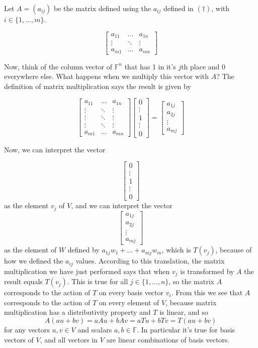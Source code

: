\documentclass{article}
\theoremstyle{plain}
\newcommand{\bF}{\mathbb{F}}
\begin{document}
Let $A=(a_{ij})$ be the matrix defined using the $a_{ij}$ defined in $(\dagger)$, with $i\in\{1,\ldots,m\}$. 

\[
\begin{bmatrix}
a_{11}  & \dots & a_{1n} \\
\vdots & \ddots & \vdots \\
a_{m1}  & \dots & a_{mn} 
\end{bmatrix}
\]

Now, think of the column vector of $\bF^n$ that has 1 in it's $j$th place and 0 everywhere else. What happens when we multiply this vector with $A$? The definition of matrix multiplication says the result is given by

\[
\begin{bmatrix}
a_{11}  & \dots & a_{1n} \\
\vdots & \ddots & \vdots \\
\vdots & \ddots & \vdots \\
\vdots & \ddots & \vdots \\
a_{m1}  & \dots & a_{mn} 
\end{bmatrix}
\begin{bmatrix}
0\\
\vdots\\
1\\
\vdots\\
0
\end{bmatrix}
= 
\begin{bmatrix}
a_{1j}\\
a_{2j}\\
\vdots\\
a_{mj}
\end{bmatrix}
\]

Now, we can interpret the vector

\[
\begin{bmatrix}
0\\
\vdots\\
1\\
\vdots\\
0
\end{bmatrix}\]
as the element $v_j$ of $V$, and we can interpret the vector
\[\begin{bmatrix}
a_{1j}\\
a_{2j}\\
\vdots\\
a_{mj}
\end{bmatrix}
\]
as the element of $W$ defined by $a_{1j}w_1+\ldots + a_{mj}w_m$, which is $T(v_j)$, because of how we defined the $a_{ij}$ values. According to this translation, the matrix multiplication we have just performed says that when $v_j$ is transformed by $A$ the result equals $T(v_j)$. This is true for all $j\in\{1,\ldots,n\}$, so the matrix $A$ corresponds to the action of $T$ on every basis vector $v_i$. From this we see that $A$ corresponds to the action of $T$ on every element of $V$, because matrix multiplication has a distributivity property and $T$ is linear, and so 
\[A(au+bv) = aAu + bAv = aTu + bTv = T(au+bv)\]
for any vectors $u,v\in V$ and scalars $a,b\in\bF$. In particular it's true for basis vectors of $V$, and all vectors in $V$ are linear combinations of basis vectors.
\end{document}
